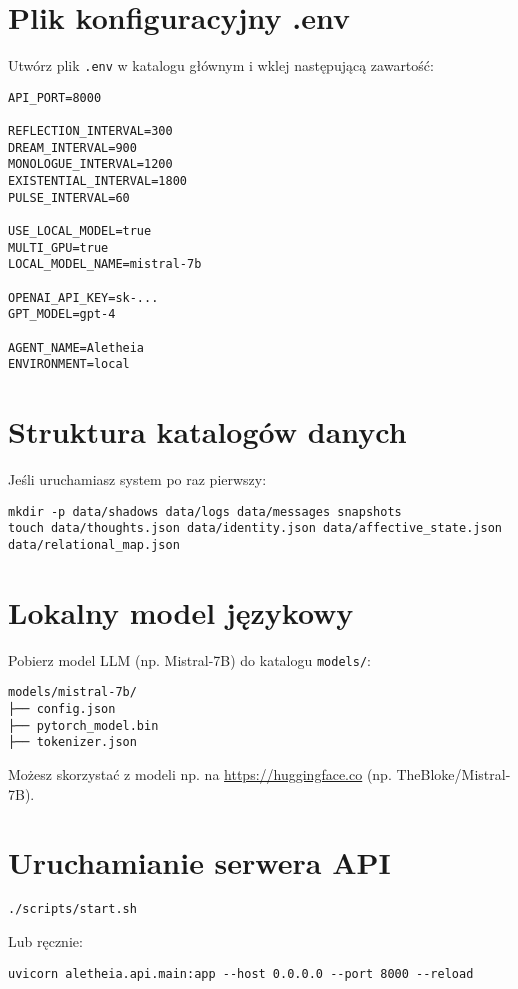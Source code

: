 \documentclass[12pt]{article}
\begin{document}
\section{Plik konfiguracyjny .env}

Utwórz plik \texttt{.env} w katalogu głównym i wklej następującą zawartość:

\begin{lstlisting}
API_PORT=8000

REFLECTION_INTERVAL=300
DREAM_INTERVAL=900
MONOLOGUE_INTERVAL=1200
EXISTENTIAL_INTERVAL=1800
PULSE_INTERVAL=60

USE_LOCAL_MODEL=true
MULTI_GPU=true
LOCAL_MODEL_NAME=mistral-7b

OPENAI_API_KEY=sk-...
GPT_MODEL=gpt-4

AGENT_NAME=Aletheia
ENVIRONMENT=local
\end{lstlisting}

\section{Struktura katalogów danych}
Jeśli uruchamiasz system po raz pierwszy:

\begin{lstlisting}
mkdir -p data/shadows data/logs data/messages snapshots
touch data/thoughts.json data/identity.json data/affective_state.json data/relational_map.json
\end{lstlisting}

\section{Lokalny model językowy}
Pobierz model LLM (np. Mistral-7B) do katalogu \texttt{models/}:

\begin{lstlisting}
models/mistral-7b/
├── config.json
├── pytorch_model.bin
├── tokenizer.json
\end{lstlisting}

Możesz skorzystać z modeli np. na \url{https://huggingface.co} (np. TheBloke/Mistral-7B).

\section{Uruchamianie serwera API}
\begin{lstlisting}
./scripts/start.sh
\end{lstlisting}

Lub ręcznie:
\begin{lstlisting}
uvicorn aletheia.api.main:app --host 0.0.0.0 --port 8000 --reload
\end{lstlisting}
\end{document}
